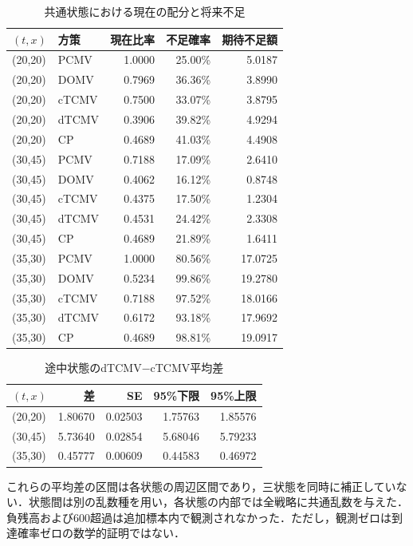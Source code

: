 \documentclass[11pt,a4paper]{article}
\numberwithin{equation}{section}
\numberwithin{table}{section}
\numberwithin{figure}{section}
\theoremstyle{plain}
\theoremstyle{definition}
\begin{document}
\begin{table}[htbp]\centering\small
\caption{共通状態における現在の配分と将来不足}\label{tab:rolling-detail}
\begin{tabular}{llrrr}\toprule
$(t,x)$ & 方策 & 現在比率 & 不足確率 & 期待不足額 \\ \midrule
(20,20) & PCMV & 1.0000 & 25.00\% & 5.0187 \\
(20,20) & DOMV & 0.7969 & 36.36\% & 3.8990 \\
(20,20) & cTCMV & 0.7500 & 33.07\% & 3.8795 \\
(20,20) & dTCMV & 0.3906 & 39.82\% & 4.9294 \\
(20,20) & CP & 0.4689 & 41.03\% & 4.4908 \\
(30,45) & PCMV & 0.7188 & 17.09\% & 2.6410 \\
(30,45) & DOMV & 0.4062 & 16.12\% & 0.8748 \\
(30,45) & cTCMV & 0.4375 & 17.50\% & 1.2304 \\
(30,45) & dTCMV & 0.4531 & 24.42\% & 2.3308 \\
(30,45) & CP & 0.4689 & 21.89\% & 1.6411 \\
(35,30) & PCMV & 1.0000 & 80.56\% & 17.0725 \\
(35,30) & DOMV & 0.5234 & 99.86\% & 19.2780 \\
(35,30) & cTCMV & 0.7188 & 97.52\% & 18.0166 \\
(35,30) & dTCMV & 0.6172 & 93.18\% & 17.9692 \\
(35,30) & CP & 0.4689 & 98.81\% & 19.0917 \\
\bottomrule\end{tabular}\end{table}

\begin{table}[htbp]\centering\small
\caption{途中状態のdTCMV−cTCMV平均差}\label{tab:rolling-pairs}
\begin{tabular}{lrrrr}\toprule
$(t,x)$ & 差 & SE & 95\%下限 & 95\%上限 \\ \midrule
(20,20) & 1.80670 & 0.02503 & 1.75763 & 1.85576 \\
(30,45) & 5.73640 & 0.02854 & 5.68046 & 5.79233 \\
(35,30) & 0.45777 & 0.00609 & 0.44583 & 0.46972 \\
\bottomrule\end{tabular}\end{table}

これらの平均差の区間は各状態の周辺区間であり，三状態を同時に補正していない．状態間は別の乱数種を用い，各状態の内部では全戦略に共通乱数を与えた．負残高および600超過は追加標本内で観測されなかった．ただし，観測ゼロは到達確率ゼロの数学的証明ではない．
\end{document}
